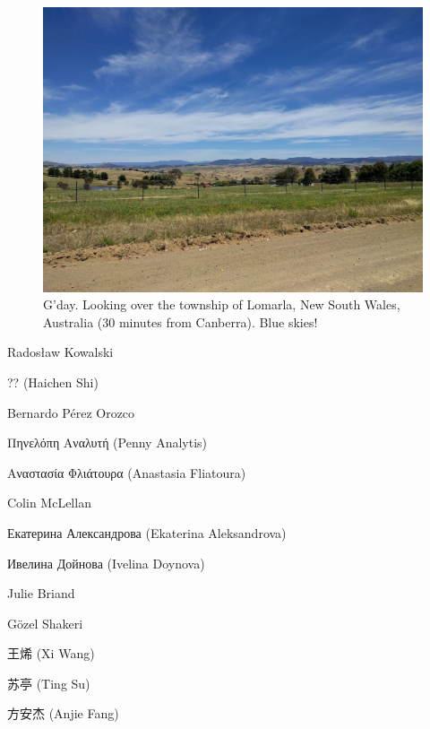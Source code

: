 \begin{preamble}
\renewcommand{\figurename}{Picture}
\begin{figure}
    \begin{center}
    \vspace*{-9mm}
    \includegraphics[width=1\textwidth]{figures/ch0-australia.jpg}
    \end{center}
    \vspace*{-6mm}
    \caption[]{G'day. Looking over the township of Lomarla, New South Wales, Australia (30 minutes from Canberra). Blue skies!}
    \label{fig:acks_australia}
\end{figure}
\renewcommand{\figurename}{Figure}





Rados\l{}aw Kowalski

?? (Haichen Shi)

Bernardo P\'{e}rez Orozco

Πηνελόπη Αναλυτή (Penny Analytis)

Αναστασία Φλιάτουρα (Anastasia Fliatoura)

Colin McLellan

Екатерина Александрова (Ekaterina Aleksandrova)

Ивелина Дойнова (Ivelina Doynova)

Julie Briand

G\"{o}zel Shakeri

{\asianfont 王烯} (Xi Wang)

{\asianfont 苏亭} (Ting Su)

{\asianfont 方安杰} (Anjie Fang)


\end{preamble}
